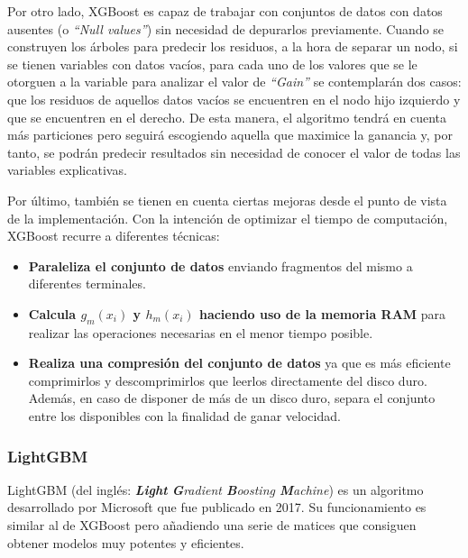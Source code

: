 \documentclass[12pt,twoside]{article}
\begin{document}
Por otro lado, XGBoost es capaz de trabajar con conjuntos de datos con datos ausentes (o \textit{``Null values''}) sin necesidad de depurarlos previamente. Cuando se construyen los árboles para predecir los residuos, a la hora de separar un nodo, si se tienen variables con datos vacíos, para cada uno de los valores que se le otorguen a la variable para analizar el valor de \textit{``Gain''} se contemplarán dos casos: que los residuos de aquellos datos vacíos se encuentren en el nodo hijo izquierdo y que se encuentren en el derecho. De esta manera, el algoritmo tendrá en cuenta más particiones pero seguirá escogiendo aquella que maximice la ganancia y, por tanto, se podrán predecir resultados sin necesidad de conocer el valor de todas las variables explicativas.

Por último, también se tienen en cuenta ciertas mejoras desde el punto de vista de la implementación. Con la intención de optimizar el tiempo de computación, XGBoost recurre a diferentes técnicas: 
\begin{itemize}
\item \textbf{Paraleliza el conjunto de datos} enviando fragmentos del mismo a diferentes terminales.

\item \textbf{Calcula $g_m(x_i)$ y $h_m(x_i)$ haciendo uso de la memoria RAM} para realizar las operaciones necesarias en el menor tiempo posible.

\item \textbf{Realiza una compresión del conjunto de datos} ya que es más eficiente comprimirlos y descomprimirlos que leerlos directamente del disco duro. Además, en caso de disponer de más de un disco duro, separa el conjunto entre los disponibles con la finalidad de ganar velocidad.
\end{itemize}



\subsubsection{LightGBM}

LightGBM (del inglés: \textit{\textbf{Light} \textbf{G}radient \textbf{B}oosting \textbf{M}achine}) \cite{CH02} es un algoritmo desarrollado por Microsoft que fue publicado en 2017. Su funcionamiento es similar al de XGBoost pero añadiendo una serie de matices que consiguen obtener modelos muy potentes y eficientes.
\end{document}
